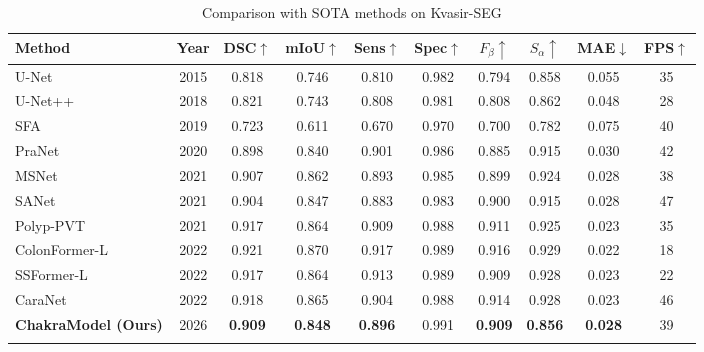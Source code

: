 \begin{table}[t]
\centering
\caption{Comparison with SOTA methods on Kvasir-SEG}
\label{tab:sota}
\begin{tabular}{lccccccccc}
\hline
Method & Year & DSC$\uparrow$ & mIoU$\uparrow$ & Sens$\uparrow$ & Spec$\uparrow$ & $F_\beta\uparrow$ & $S_\alpha\uparrow$ & MAE$\downarrow$ & FPS$\uparrow$ \\
\hline
U-Net & 2015 & 0.818 & 0.746 & 0.810 & 0.982 & 0.794 & 0.858 & 0.055 & 35 \\
U-Net++ & 2018 & 0.821 & 0.743 & 0.808 & 0.981 & 0.808 & 0.862 & 0.048 & 28 \\
SFA & 2019 & 0.723 & 0.611 & 0.670 & 0.970 & 0.700 & 0.782 & 0.075 & 40 \\
PraNet & 2020 & 0.898 & 0.840 & 0.901 & 0.986 & 0.885 & 0.915 & 0.030 & 42 \\
MSNet & 2021 & 0.907 & 0.862 & 0.893 & 0.985 & 0.899 & 0.924 & 0.028 & 38 \\
SANet & 2021 & 0.904 & 0.847 & 0.883 & 0.983 & 0.900 & 0.915 & 0.028 & 47 \\
Polyp-PVT & 2021 & 0.917 & 0.864 & 0.909 & 0.988 & 0.911 & 0.925 & 0.023 & 35 \\
ColonFormer-L & 2022 & 0.921 & 0.870 & 0.917 & 0.989 & 0.916 & 0.929 & 0.022 & 18 \\
SSFormer-L & 2022 & 0.917 & 0.864 & 0.913 & 0.989 & 0.909 & 0.928 & 0.023 & 22 \\
CaraNet & 2022 & 0.918 & 0.865 & 0.904 & 0.988 & 0.914 & 0.928 & 0.023 & 46 \\
\hline
\textbf{ChakraModel (Ours)} & 2026 & \textbf{0.909} & \textbf{0.848} & \textbf{0.896} & 0.991 & \textbf{0.909} & \textbf{0.856} & \textbf{0.028} & 39 \\\\
\hline
\end{tabular}
\end{table}

